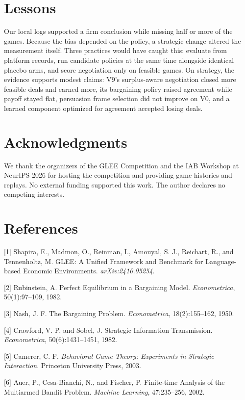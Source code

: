 \documentclass{article}
\begin{document}
\section{Lessons}

Our local logs supported a firm conclusion while missing half or more of the games. Because the bias depended on the policy, a strategic change altered the measurement itself. Three practices would have caught this: evaluate from platform records, run candidate policies at the same time alongside identical placebo arms, and score negotiation only on feasible games. On strategy, the evidence supports modest claims: V9's surplus-aware negotiation closed more feasible deals and earned more, its bargaining policy raised agreement while payoff stayed flat, persuasion frame selection did not improve on V0, and a learned component optimized for agreement accepted losing deals.

\section*{Acknowledgments}
We thank the organizers of the GLEE Competition and the IAB Workshop at NeurIPS 2026 for hosting the competition and providing game histories and replays. No external funding supported this work. The author declares no competing interests.

\section*{References}
\small

[1] Shapira, E., Madmon, O., Reinman, I., Amouyal, S. J., Reichart, R., and Tennenholtz, M. GLEE: A Unified Framework and Benchmark for Language-based Economic Environments. \emph{arXiv:2410.05254}.

[2] Rubinstein, A. Perfect Equilibrium in a Bargaining Model. \emph{Econometrica}, 50(1):97--109, 1982.

[3] Nash, J. F. The Bargaining Problem. \emph{Econometrica}, 18(2):155--162, 1950.

[4] Crawford, V. P. and Sobel, J. Strategic Information Transmission. \emph{Econometrica}, 50(6):1431--1451, 1982.

[5] Camerer, C. F. \emph{Behavioral Game Theory: Experiments in Strategic Interaction}. Princeton University Press, 2003.

[6] Auer, P., Cesa-Bianchi, N., and Fischer, P. Finite-time Analysis of the Multiarmed Bandit Problem. \emph{Machine Learning}, 47:235--256, 2002.
\end{document}
